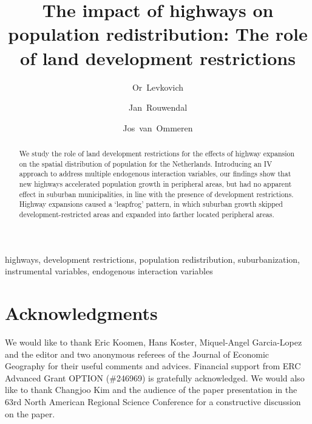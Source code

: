 \documentclass[a4paper,authoryear,review]{elsarticle}  	%
\begin{document}
\begin{frontmatter}
	\title{The impact of highways on population redistribution: The role of land development restrictions}
	\author[VU]{Or~Levkovich}
	\author[VU,TI]{Jan~Rouwendal}
	\author[VU,TI]{Jos~van~Ommeren}
	\address[VU]{Department of Spatial Economics, VU University, De Boelelaan 1105, 1081 HV Amsterdam, The Netherlands.}
	\address[TI]{Tinbergen Institute, Gustav Mahlerplein 117, 1082 MS Amsterdam, The Netherlands.}
	
	\begin{keyword}
		highways, development restrictions, population redistribution, suburbanization, instrumental variables, endogenous interaction variables
	\end{keyword}

\begin{abstract}
	We study the role of land development restrictions for the effects of highway expansion on the spatial distribution of population for the Netherlands. 
	Introducing an IV approach to address multiple endogenous interaction variables, our findings show that new highways accelerated population growth in peripheral areas, but had no apparent effect in suburban municipalities, in line with the presence of development restrictions. Highway expansions caused a ‘leapfrog’ pattern, in which suburban growth skipped development-restricted areas and expanded into farther located peripheral areas.

\end{abstract}
\end{frontmatter}

\section*{Acknowledgments} 	%
	We would like to thank Eric Koomen, Hans Koster, Miquel-Angel Garcia-Lopez and the editor and two anonymous referees of the Journal of Economic Geography for their useful comments and advices. Financial support from ERC Advanced Grant OPTION (\#246969) is gratefully acknowledged. We would also like to thank Changjoo Kim and the audience of the paper presentation in the 63rd North American Regional Science Conference for a constructive discussion on the paper.
\end{document}
